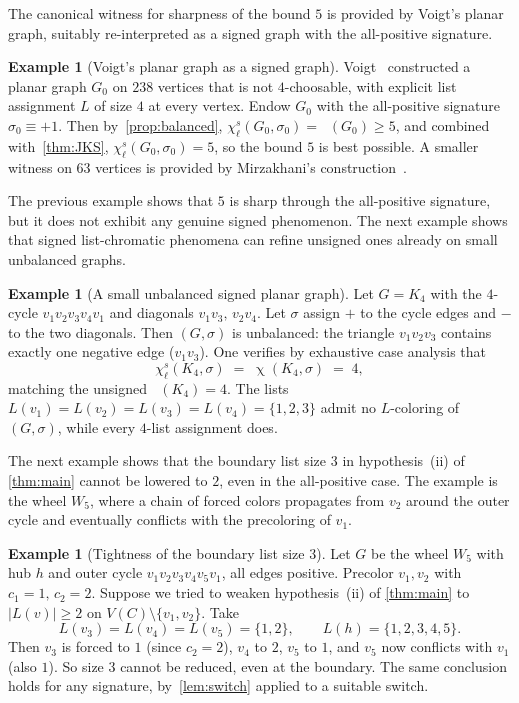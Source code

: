 \documentclass[11pt,a4paper]{article}
\theoremstyle{plain}
\theoremstyle{definition}
\newtheorem{example}[theorem]{Example}
\newcommand{\V}{V}
\DeclareMathOperator{\chia}{\chi}
\DeclareMathOperator{\chil}{\chi_\ell}
\newcommand{\chs}{\chi_{\ell}^{s}}
\newcommand{\Gs}{(G,\sigma)}
\begin{document}
The canonical witness for sharpness of the bound $5$ is provided
by Voigt's planar graph, suitably re-interpreted as a signed graph
with the all-positive signature.

\begin{example}[Voigt's planar graph as a signed graph]\label{ex:voigt}
Voigt~\cite{Voigt1993} constructed a planar graph $G_0$ on $238$
vertices that is not $4$-choosable, with explicit list assignment
$L$ of size $4$ at every vertex. Endow $G_0$ with the all-positive
signature $\sigma_0\equiv+1$. Then by~\cref{prop:balanced},
$\chs(G_0,\sigma_0)=\chil(G_0)\ge 5$, and combined
with~\cref{thm:JKS}, $\chs(G_0,\sigma_0)=5$, so the bound $5$ is
best possible. A smaller witness on $63$ vertices is provided by
Mirzakhani's construction~\cite{Mirzakhani1996}.
\end{example}

The previous example shows that $5$ is sharp through the all-positive
signature, but it does not exhibit any genuine signed phenomenon.
The next example shows that signed list-chromatic phenomena can
refine unsigned ones already on small unbalanced graphs.

\begin{example}[A small unbalanced signed planar graph]\label{ex:K4}
Let $G=K_4$ with the $4$-cycle $v_1v_2v_3v_4v_1$ and diagonals
$v_1v_3,\,v_2v_4$. Let $\sigma$ assign $+$ to the cycle edges and
$-$ to the two diagonals. Then $\Gs$ is unbalanced: the triangle
$v_1v_2v_3$ contains exactly one negative edge ($v_1v_3$). One
verifies by exhaustive case analysis that
\[
   \chs(K_4,\sigma) \;=\; \chia(K_4,\sigma) \;=\; 4,
\]
matching the unsigned $\chil(K_4)=4$. The lists
$L(v_1)=L(v_2)=L(v_3)=L(v_4)=\{1,2,3\}$ admit no $L$-coloring of
$\Gs$, while every $4$-list assignment does.
\end{example}

The next example shows that the boundary list size $3$ in
hypothesis~(ii) of \cref{thm:main} cannot be lowered to $2$, even
in the all-positive case. The example is the wheel $W_5$, where a
chain of forced colors propagates from $v_2$ around the outer cycle
and eventually conflicts with the precoloring of $v_1$.

\begin{example}[Tightness of the boundary list size $3$]\label{ex:boundary}
Let $G$ be the wheel $W_5$ with hub $h$ and outer cycle
$v_1v_2v_3v_4v_5v_1$, all edges positive. Precolor $v_1,v_2$ with
$c_1=1,\,c_2=2$. Suppose we tried to weaken hypothesis~(ii) of
\cref{thm:main} to $|L(v)|\ge 2$ on $\V(C)\setminus\{v_1,v_2\}$.
Take
\[
   L(v_3)=L(v_4)=L(v_5)=\{1,2\},\qquad L(h)=\{1,2,3,4,5\}.
\]
Then $v_3$ is forced to $1$ (since $c_2=2$), $v_4$ to $2$, $v_5$
to $1$, and $v_5$ now conflicts with $v_1$ (also $1$). So size $3$
cannot be reduced, even at the boundary. The same conclusion holds
for any signature, by~\cref{lem:switch} applied to a suitable
switch.
\end{example}
\end{document}
